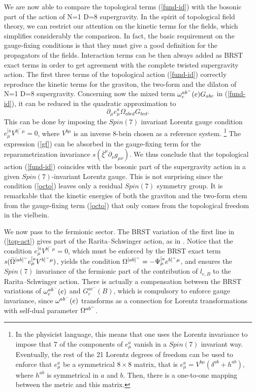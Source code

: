 \documentclass[a4paper,12pt]{article}
\def\L{l}
\begin{document}
We are now able to compare the topological terms (\ref{fund-id})
with the bosonic part of the action of N=1 D=8 supergravity.
In the spirit of topological field theory, we can restrict our attention
on the kinetic terms for the fields, which simplifies considerably
the comparison. In fact, the basic requirement 
on the gauge-fixing conditions is that they must give a good definition
for the propagators of the fields. Interaction terms can be then always
added as BRST exact terms in order to get agreement with the complete 
twisted supergravity action. 
The first three terms of the topological action (\ref{fund-id})
correctly reproduce the kinetic terms for the graviton, the two-form
and the dilaton of N=1 D=8 supergravity.
Concerning now the mixed term 
$ \omega_c^{ab^-}(e)G_{abc}$ in (\ref{fund-id}),
it can be reduced in the quadratic approximation 
to 
\begin{equation}
\partial _\mu e^a_\mu \Omega_{abcd} G_{bcd} .
\label{gf}
\end{equation}
This can be done by imposing the $Spin(7)$ invariant Lorentz
gauge condition
$e^{[a}_\mu V^{b]^-\mu}=0$, where  $V^{b\mu}$ is an inverse 
8-bein chosen as a reference system.
\footnote{In the physicist language, this means that one uses 
the Lorentz invariance to impose that 7 of the components of 
$e^a_\mu$  vanish in a  $Spin(7)$ invariant way. Eventually, the rest
of the 21 Lorentz degrees of freedom can be used to enforce that
$e^a_\mu$ be a symmetrical
$8\times 8$ matrix, that is $e^a_\mu= V^{b\mu }  (\delta  ^{ab} +
h^{ab})$, where
$h^{ab}$ is symmetrical in $a$ and $b$. Then, there is a
one-to-one mapping between the metric and this matrix.}
The expression (\ref{gf}) can be absorbed  in the gauge-fixing
term for the reparametrization invariance
$s(\bar \xi^\mu \partial _\nu g_{\mu\nu})$.
We thus conclude that the topological action (\ref{fund-id})
coincides with the bosonic part of the supergravity action
in a given $Spin(7)$-invariant Lorentz gauge. This is not surprising
since the condition (\ref{octo}) leaves only a residual $Spin(7)$
symmetry group. 
It is remarkable that the kinetic energies of both the graviton and the
two-form stem from the gauge-fixing term (\ref{octo}) that only comes from the
topological freedom in the vielbein.

We now pass to the fermionic sector. The BRST variation
of the first line in (\ref{top-act})
gives part of the Rarita--Schwinger action, as in
\cite{BT2}. Notice that the condition $e^{[a}_\mu V^{b]^-\mu}=0$, which 
must be enforced by the BRST exact term $s  (\bar {\Omega} ^{[ab]^-}e^{[a}_\mu
V^{b]^-\mu})$,   yields the condition
$\Omega ^{[ab]^-}=-\Psi ^{[a}_\mu e ^{b]^-\mu}$, and ensures the $Spin(7)$
invariance of the fermionic part of the contribution of $\L_{e,B}$ to
the  Rarita--Schwinger action. There is actually a compensation between
the BRST variations of  $ \omega _c^{ab^-}(e)$ and $G ^{ac^-}_c(B) $,
which is compulsory to enforce gauge invariance, since 
$\omega   ^{ab^-}(e)$  transforms as a connection for Lorentz transformations 
with self-dual parameter $\Omega^{ab^-}$.
\end{document}
